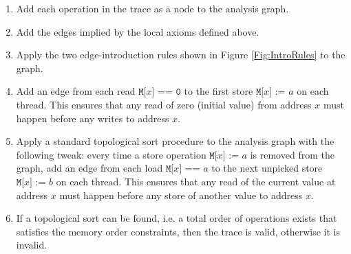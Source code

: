 \documentclass[11pt]{article}
\begin{document}
\begin{enumerate}

\item Add each operation in the trace as a node to the analysis graph.

\item Add the edges implied by the local axioms defined
above.

\item Apply the two edge-introduction rules shown in Figure
\ref{Fig:IntroRules} to the graph. 

\item Add an edge from each read $\texttt{M[}x\texttt{] == 0}$ to the
first store $\texttt{M[}x\texttt{] := }a$ on each
thread.  This ensures that any read of zero (initial value) from
address $x$ must happen before any writes to address $x$.

\item Apply a standard topological sort procedure to the analysis
graph with the following tweak: every time a store operation
$\texttt{M[}x\texttt{] := }a$ is removed from the graph, add an edge
from each load $\texttt{M[}x\texttt{] == }a$ to the next
unpicked store $\texttt{M[}x\texttt{] := }b$ on each
thread.  This ensures that any read of the current value at address
$x$ must happen before any store of another value to address $x$.

\item If a topological sort can be found, i.e.  a total order of
operations exists that satisfies the memory order constraints, then
the trace is valid, otherwise it is invalid.

\end{enumerate}
\end{document}
